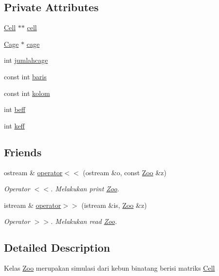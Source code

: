 \subsection*{Private Attributes}
\begin{DoxyCompactItemize}
\item 
\hyperlink{classCell}{Cell} $\ast$$\ast$ \hyperlink{classZoo_a264dc6d031ca713ca28969120bb599ab}{cell}
\item 
\hyperlink{classCage}{Cage} $\ast$ \hyperlink{classZoo_a92269930ce6363c83b2b8fc7c8abd81d}{cage}
\item 
int \hyperlink{classZoo_ab9db4289e7ecd6856e4b7329dbde19d6}{jumlahcage}
\item 
const int \hyperlink{classZoo_a5aab4219fc1f6877609c6cd294abbc59}{baris}
\item 
const int \hyperlink{classZoo_a5ac40c8ba9d8a115c90c2aad733ee59c}{kolom}
\item 
int \hyperlink{classZoo_a859a09c6586ebfe53dc7504d0219e7cb}{beff}
\item 
int \hyperlink{classZoo_a9e90eb77a17d3767773b2a660d0ce981}{keff}
\end{DoxyCompactItemize}
\subsection*{Friends}
\begin{DoxyCompactItemize}
\item 
ostream \& \hyperlink{classZoo_a9a5a25ae9291345b74f5d8f7af9719db}{operator$<$$<$} (ostream \&o, const \hyperlink{classZoo}{Zoo} \&z)
\begin{DoxyCompactList}\small\item\em Operator $<$$<$. Melakukan print \hyperlink{classZoo}{Zoo}. \end{DoxyCompactList}\item 
istream \& \hyperlink{classZoo_a66565ea7c66ddb3acdcb0b67930b8615}{operator$>$$>$} (istream \&is, \hyperlink{classZoo}{Zoo} \&z)
\begin{DoxyCompactList}\small\item\em Operator $>$$>$. Melakukan read \hyperlink{classZoo}{Zoo}. \end{DoxyCompactList}\end{DoxyCompactItemize}


\subsection{Detailed Description}
Kelas \hyperlink{classZoo}{Zoo} merupakan simulasi dari kebun binatang berisi matriks \hyperlink{classCell}{Cell} 

